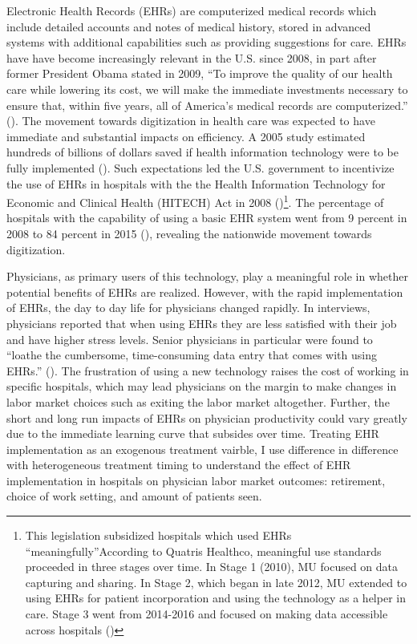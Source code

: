 \documentclass[11pt]{article}
\begin{document}
Electronic Health Records (EHRs) are computerized medical records which include detailed accounts and notes of medical history, stored in advanced systems with additional capabilities such as providing suggestions for care. EHRs have have become increasingly relevant in the U.S. since 2008, in part after former President Obama stated in 2009, “To improve the quality of our health care while lowering its cost, we will make the immediate investments necessary to ensure that, within five years, all of America’s medical records are computerized.” (\cite{presquote}). The movement towards digitization in health care was expected to have immediate and substantial impacts on efficiency. A 2005 study estimated hundreds of billions of dollars saved if health information technology were to be fully implemented (\cite{hillestad2005}). Such expectations led the U.S. government to incentivize the use of EHRs in hospitals with the the Health Information Technology for Economic and Clinical Health (HITECH) Act in 2008 (\cite{hitech})\footnote{This legislation subsidized hospitals which used EHRs “meaningfully”According to Quatris Healthco, meaningful use standards proceeded in three stages over time. In Stage 1 (2010), MU focused on data capturing and sharing. In Stage 2, which began in late 2012, MU extended to using EHRs for patient incorporation and using the technology as a helper in care. Stage 3 went from 2014-2016 and focused on making data accessible across hospitals (\cite{meanuse})}. The percentage of hospitals with the capability of using a basic EHR system went from 9 percent in 2008 to 84 percent in 2015 (\cite{stats}), revealing the nationwide movement towards digitization.

Physicians, as primary users of this technology, play a meaningful role in whether potential benefits of EHRs are realized. However, with the rapid implementation of EHRs, the day to day life for physicians changed rapidly. In interviews, physicians reported that when using EHRs they are less satisfied with their job and have higher stress levels. Senior physicians in particular were found to “loathe the cumbersome, time-consuming data entry that comes with using EHRs.” (\cite{CollierBurnout}). The frustration of using a new technology raises the cost of working in specific hospitals, which may lead physicians on the margin to make changes in labor market choices such as exiting the labor market altogether. Further, the short and long run impacts of EHRs on physician productivity could vary greatly due to the immediate learning curve that subsides over time.  Treating EHR implementation as an exogenous treatment vairble, I use difference in difference with heterogeneous treatment timing to understand the effect of EHR implementation in hospitals on physician labor market outcomes: retirement, choice of work setting, and amount of patients seen.
\end{document}
